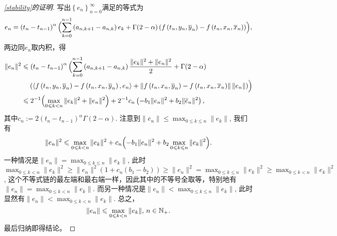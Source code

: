 \begin{proof}[\cref{stability}的证明]
    写出$\left\{e_n\right\}_{n=0}^\infty$满足的等式为
    \begin{equation*}
        e_n=\left(t_n-t_{n-1}\right)^\alpha\Bigl(\sum_{k=0}^{n-1}\left(a_{n,k+1}-a_{n,k}\right)e_k+\Gamma(2-\alpha)\left(f\left(t_n,y_n,\overline y_n\right)-f\left(t_n,x_n,\overline x_n\right)\right)\Bigr),
    \end{equation*}
    两边同$e_n$取内积，得
    \begin{align*}
        \|e_n\|^2&\leqslant\left(t_n-t_{n-1}\right)^\alpha\Bigl(\sum_{k=0}^{n-1}\left(a_{n,k+1}-a_{n,k}\right)\frac{\|e_k\|^2+\|e_n\|^2}{2}+\Gamma(2-\alpha)
        \\& \relphantom{=}\left(\left<f\left(t_n,y_n,\overline y_n\right)-f\left(t_n,x_n,\overline y_n\right),e_n\right>+\left\|f\left(t_n,x_n,\overline y_n\right)-f\left(t_n,x_n,\overline x_n\right)\right\|\left\|e_n\right\|\right)\Bigr)
        \\&\leqslant 2^{-1}\Bigl(\max_{0\leqslant k<n} \|e_k\|^2 + \|e_n\|^2\Bigr)
        +2^{-1}c_n\left(-b_1 \|e_n\|^2+b_2 \|\overline e_n\|^2\right),
    \end{align*}
    其中$c_n:=2\left(t_n-t_{n-1}\right)^\alpha\Gamma(2-\alpha)$. 注意到$\|\overline e_n\|\leqslant \max_{0\leqslant k\leqslant n} \|e_k\|$, 我们有
    \begin{equation*}
        \|e_n\|^2\leqslant \max_{0\leqslant k<n} \|e_k\|^2+c_n\Bigl(-b_1 \|e_n\|^2+b_2 \max_{0\leqslant k\leqslant n} \|e_k\|^2\Bigr).
    \end{equation*}
    一种情况是$\|e_n\|=\max_{0\leqslant k\leqslant n} \|e_k\|$, 此时$\max_{0\leqslant k<n} \|e_k\|^2 \geqslant \|e_n\|^2 (1+ c_n(b_1-b_2))\geqslant \|e_n\|^2=\max_{0\leqslant k\leqslant n} \|e_k\|^2\geqslant \max_{0\leqslant k<n} \|e_k\|^2$, 这个不等式链的最左端和最右端一样，因此其中的不等号全取等，特别地有$\|e_n\|=\max_{0\leqslant k<n} \|e_k\|$. 而另一种情况是$\|e_n\|<\max_{0\leqslant k\leqslant n} \|e_k\|$, 此时显然有$\|e_n\|<\max_{0\leqslant k< n} \|e_k\|$. 总之，
    \begin{equation*}
        \|e_n\|\leqslant\max_{0\leqslant k< n} \|e_k\|,\,n\in\mathbb{N_+}.
    \end{equation*}
    最后归纳即得结论。
\end{proof}